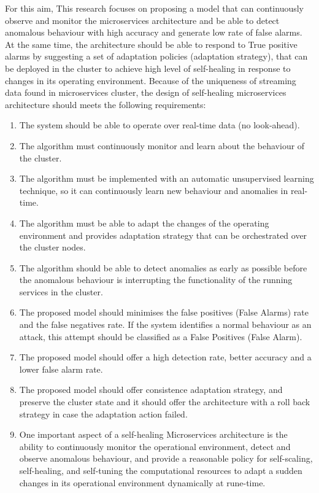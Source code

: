 \documentclass[sigconf]{acmart}
\begin{document}
For this aim, This research focuses on proposing a model that can continuously observe and monitor the microservices architecture and be able to detect anomalous behaviour with high accuracy and generate low rate of false alarms. At the same time, the architecture should be able to respond to True positive alarms by suggesting a set of adaptation policies (adaptation strategy), that can be deployed in the cluster to achieve high level of self-healing in response to changes in its operating environment. Because of the uniqueness of streaming data found in microservices cluster, the design of self-healing microservices architecture should meets the following requirements: 
\begin{enumerate}
  \item The system should be able to operate over real-time data (no look-ahead). 
  \item The algorithm must continuously monitor and learn about the behaviour of the cluster. 
  \item The algorithm must be implemented with an automatic unsupervised learning technique, so it can continuously learn new behaviour and anomalies in real-time. 
  \item The algorithm must be able to adapt the changes of the operating environment and provides adaptation strategy that can be orchestrated over the cluster nodes. 
  \item The algorithm should be able to detect anomalies as early as possible before the anomalous behaviour is interrupting the functionality of the running services in the cluster. 
  \item The proposed model should minimises the false positives (False Alarms) rate and the false negatives rate. If the system identifies a normal behaviour as an attack, this attempt should be classified as a False Positives (False Alarm). 
  \item The proposed model should offer a high detection rate, better accuracy and a lower false alarm rate.
  \item The proposed model should offer consistence adaptation strategy, and preserve the cluster state and it should offer the architecture with a roll back strategy in case the adaptation action failed. 
  \item One important aspect of a self-healing Microservices architecture is the ability to continuously monitor the operational environment, detect and observe anomalous behaviour, and provide a reasonable policy for self-scaling, self-healing, and self-tuning the computational resources to adapt a sudden changes in its operational environment dynamically at rune-time.  

\end{enumerate}
\end{document}
